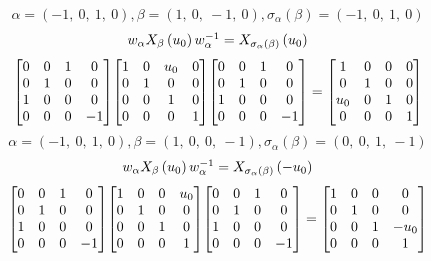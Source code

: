 \documentclass[11pt]{article}
\theoremstyle{definition}
\begin{document}
\[
\alpha = \left( -1, \  0, \  1, \  0\right), \beta = \left( 1, \  0, \  -1, \  0\right), \sigma_{\alpha}(\beta) = \left( -1, \  0, \  1, \  0\right)
\]
\[
\scaletoalign{\textwidth}{w_{\alpha} X_{\beta}\left(u_{0}\right) w_{\alpha}^{-1} = X_{\sigma_{\alpha}\left(\beta\right)}\left(u_{0}\right)}
\]
\[
\scaletoalign{\textwidth}{{\left[\begin{matrix}0 & 0 & 1 & 0\\0 & 1 & 0 & 0\\1 & 0 & 0 & 0\\0 & 0 & 0 & -1\end{matrix}\right]} {\left[\begin{matrix}1 & 0 & u_{0} & 0\\0 & 1 & 0 & 0\\0 & 0 & 1 & 0\\0 & 0 & 0 & 1\end{matrix}\right]} {\left[\begin{matrix}0 & 0 & 1 & 0\\0 & 1 & 0 & 0\\1 & 0 & 0 & 0\\0 & 0 & 0 & -1\end{matrix}\right]} = {\left[\begin{matrix}1 & 0 & 0 & 0\\0 & 1 & 0 & 0\\u_{0} & 0 & 1 & 0\\0 & 0 & 0 & 1\end{matrix}\right]}}
\]
\[
\alpha = \left( -1, \  0, \  1, \  0\right), \beta = \left( 1, \  0, \  0, \  -1\right), \sigma_{\alpha}(\beta) = \left( 0, \  0, \  1, \  -1\right)
\]
\[
\scaletoalign{\textwidth}{w_{\alpha} X_{\beta}\left(u_{0}\right) w_{\alpha}^{-1} = X_{\sigma_{\alpha}\left(\beta\right)}\left(- u_{0}\right)}
\]
\[
\scaletoalign{\textwidth}{{\left[\begin{matrix}0 & 0 & 1 & 0\\0 & 1 & 0 & 0\\1 & 0 & 0 & 0\\0 & 0 & 0 & -1\end{matrix}\right]} {\left[\begin{matrix}1 & 0 & 0 & u_{0}\\0 & 1 & 0 & 0\\0 & 0 & 1 & 0\\0 & 0 & 0 & 1\end{matrix}\right]} {\left[\begin{matrix}0 & 0 & 1 & 0\\0 & 1 & 0 & 0\\1 & 0 & 0 & 0\\0 & 0 & 0 & -1\end{matrix}\right]} = {\left[\begin{matrix}1 & 0 & 0 & 0\\0 & 1 & 0 & 0\\0 & 0 & 1 & - u_{0}\\0 & 0 & 0 & 1\end{matrix}\right]}}
\]
\end{document}
